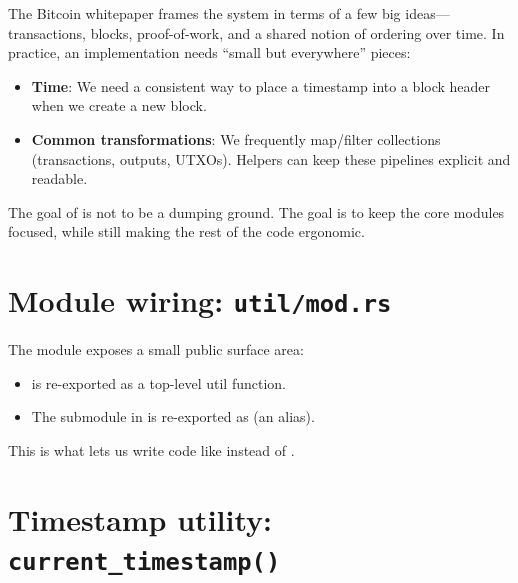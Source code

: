 The Bitcoin whitepaper frames the system in terms of a few big ideas---transactions, blocks,
proof-of-work, and a shared notion of ordering over time. In practice, an implementation
needs ``small but everywhere'' pieces:

\begin{itemize}
  \item \textbf{Time}: We need a consistent way to place a timestamp into a block header when we create a new block.
  \item \textbf{Common transformations}: We frequently map/filter collections (transactions, outputs, UTXOs). Helpers can keep these pipelines explicit and readable.
\end{itemize}

The goal of  is not to be a dumping ground. The goal is to keep the core modules
focused, while still making the rest of the code ergonomic.

\section{Module wiring: \texttt{util/mod.rs}}
\label{sec:ch07-module-wiring}

The  module exposes a small public surface area:

\begin{itemize}
  \item {} is re-exported as a top-level util function.
  \item The  submodule in  is re-exported as  (an alias).
\end{itemize}

This is what lets us write code like  instead of
.

\section{Timestamp utility: \texttt{current\_timestamp()}}
\label{sec:ch07-timestamp}


